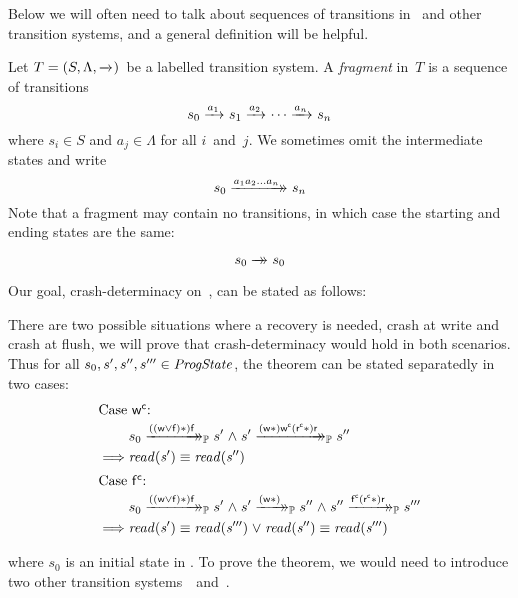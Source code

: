 Below we will often need to talk about sequences of transitions in \Prog\ and other transition systems, and a general definition will be helpful.
\begin{definition}[fragments]
Let $T = (S, \Lambda, \xrightarrow{}_{})$~be a labelled transition system.
A \emph{fragment} in~$T$ is a sequence of transitions
$$ s_0 \xrightarrow{a_1}_{} s_1 \xrightarrow{a_2}_{} \cdots \xrightarrow{a_n}_{} s_n $$
where $s_i \in S$ and $a_j \in \Lambda$ for all $i$~and~$j$.
We sometimes omit the intermediate states and write
$$ s_0 \xrightarrow{a_1a_2\ldots a_n}\mathrel{\mkern-14mu}\rightarrow_{} s_n $$
Note that a fragment may contain no transitions, in which case the starting and ending states are the same: 
$$ s_0 \xrightarrow{\vphantom{a_n}}\mathrel{\mkern-14mu}\rightarrow_{} s_0 $$
\end{definition}

Our goal, crash-determinacy on~\Prog, can be stated as follows:
\begin{theorem} \label{theoremP}
	There are two possible situations where a recovery is needed, crash at write and crash at flush, we will prove that crash-determinacy would hold in both scenarios. Thus for all $s_0, s', s'', s''' \in \mathit{ProgState}$, the theorem can be stated separatedly in two cases:
\begin{align*}
	         \intertext{Case $\actwc$:}
	         &  s_0 \ttsP{\i{((\actw \lor \actf)\ast)} \actf} s' \conj s' \ttsP{\i{(\actw \ast)} \actwc \i{(\actrc\ast)} \actr} s'' \\
	\implies & \i{read(s')} \equiv \i{read(s'')} \\
	         \intertext{Case $\actfc$:}
	         & s_0 \ttsP{\i{((\actw \lor \actf)\ast)} \actf} s' \conj s' \ttsP{\i{(\actw \ast)}} s'' \conj s'' \ttsP{\actfc \i{(\actrc \ast)} \actr} s'''  \\
	\implies & \i{read(s')} \equiv \i{read(s''')} \disj \i{read(s'')} \equiv \i{read(s''')} 
\end{align*}
\end{theorem}
where $s_0$ is an initial state in \Prog.
To prove the theorem, we would need to introduce two other transition systems~\Spec~and~\ProgInv.
